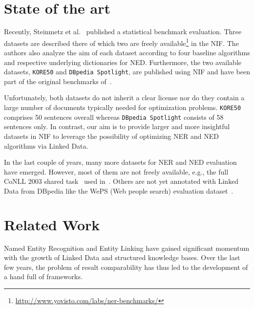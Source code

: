

\section{State of the art}

Recently, Steinmetz et al.~\cite{NEDstatBench} published a statistical benchmark evaluation.
Three datasets are described there of which two are freely available\footnote{\url{http://www.yovisto.com/labs/ner-benchmarks/}} in the NIF.
The authors also analyze the aim of each dataset according to four baseline algorithms and respective underlying dictionaries for NED.
Furthermore, the two available datasets, \texttt{KORE50} and \texttt{DBpedia Spotlight}, are published using NIF and have been part of the original benchmarks of~\cite{AIDA,spotlight}. 

Unfortunately, both datasets do not inherit a clear license nor do they contain a large number of documents typically needed for optimization problems. %
\texttt{KORE50} comprises 50 sentences overall whereas \texttt{DBpedia Spotlight} consists of 58 sentences only. 
In contrast, our aim is to provide larger and more insightful datasets in NIF to leverage the possibility of optimizing NER and NED algorithms via Linked Data.

In the last couple of years, many more datasets for NER and NED evaluation have emerged.
However, most of them are not freely available, e.g., the full CoNLL 2003 shared task~\cite{conll2003} used in~\cite{AIDA}.
Others are not yet annotated with Linked Data from DBpedia like the WePS (Web people search) evaluation dataset~\cite{WEPS}.




\section{Related Work}
Named Entity Recognition and Entity Linking have gained significant momentum with the growth of Linked Data and structured knowledge bases. Over the last few years, the problem of result comparability has thus led to the development of a hand full of frameworks.

